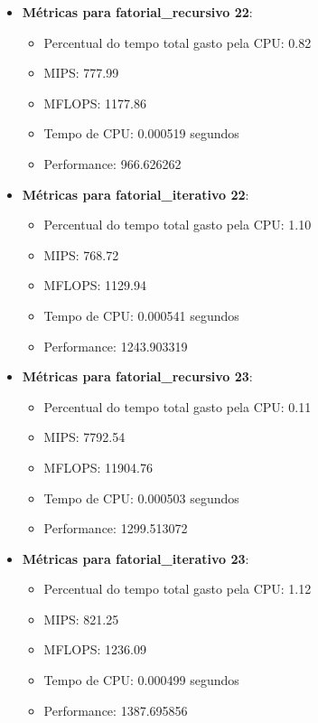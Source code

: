 \documentclass[12pt]{article}
\begin{document}
\begin{itemize}
    \item \textbf{Métricas para fatorial\_recursivo 22}:
    \begin{itemize}
        \item Percentual do tempo total gasto pela CPU: 0.82
        \item MIPS: 777.99
        \item MFLOPS: 1177.86
        \item Tempo de CPU: 0.000519 segundos
        \item Performance: 966.626262
    \end{itemize}

    \item \textbf{Métricas para fatorial\_iterativo 22}:
    \begin{itemize}
        \item Percentual do tempo total gasto pela CPU: 1.10
        \item MIPS: 768.72
        \item MFLOPS: 1129.94
        \item Tempo de CPU: 0.000541 segundos
        \item Performance: 1243.903319
    \end{itemize}

    \item \textbf{Métricas para fatorial\_recursivo 23}:
    \begin{itemize}
        \item Percentual do tempo total gasto pela CPU: 0.11
        \item MIPS: 7792.54
        \item MFLOPS: 11904.76
        \item Tempo de CPU: 0.000503 segundos
        \item Performance: 1299.513072
    \end{itemize}

    \item \textbf{Métricas para fatorial\_iterativo 23}:
    \begin{itemize}
        \item Percentual do tempo total gasto pela CPU: 1.12
        \item MIPS: 821.25
        \item MFLOPS: 1236.09
        \item Tempo de CPU: 0.000499 segundos
        \item Performance: 1387.695856
    \end{itemize}


\end{itemize}
\end{document}
